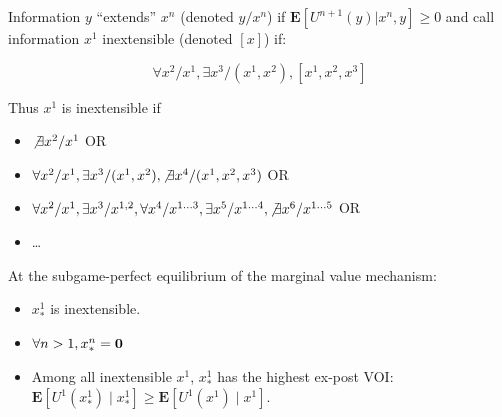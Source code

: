\begin{definition}[Inextensibility]
Information $y$ ``extends'' $x^n$ (denoted $y/x^n$) if $\mathbf{E}[U^{n+1}(y)|x^n,y]\ge 0$ and call information $x^1$ inextensible (denoted $[x]$) if:

$$\forall x^2/x^1, \exists x^3/(x^1,x^2), [x^1,x^2,x^3]$$
\end{definition}

Thus $x^1$ is inextensible if

\begin{itemize}
\item $\not\exists x^2/x^1$ OR
\item $\forall x^2/x^1,\exists x^3/(x^1,x^2),\not\exists x^4/(x^1,x^2,x^3)$ OR
\item $\forall x^2/x^1,\exists x^3/x^{1,2},\forall x^4/x^{1\dots 3},\exists x^5/x^{1\dots 4},\not\exists x^6/x^{1\dots 5}$ OR
\item \dots
\end{itemize}

\begin{theorem}
At the subgame-perfect equilibrium of the marginal value mechanism:
\begin{itemize}
\item $x^1_*$ is inextensible.
\item $\forall n>1,x^n_*=\mathbf{0}$
\item Among all inextensible $x^1$, $x^1_*$ has the highest ex-post VOI: $\mathbf{E}[U^1(x^1_*)\mid x^1_*]\ge\mathbf{E}[U^1(x^1)\mid x^1]$.
\end{itemize}
\label{thm:eq}
\end{theorem}

